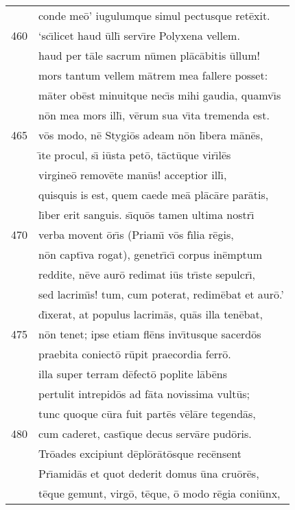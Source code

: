 \documentclass[paper=6in:9in,pagesize=pdftex,
               headinclude=on,footinclude=on,12pt]{scrbook}
\begin{document}
\begin{longtable}[p]{ r l }
 & conde me\=o' iugulumque simul pectusque ret\=exit.\\ 
460 & `sc\={\i}licet haud \=ull\={\i} serv\={\i}re Polyxena vellem.\\ 
 & haud per t\=ale sacrum n\=umen pl\=ac\=abitis \=ullum!\\ 
 & mors tantum vellem m\=atrem mea fallere posset:\\ 
 & m\=ater ob\=est minuitque nec\={\i}s mihi gaudia, quamv\={\i}s\\ 
 & n\=on mea mors ill\={\i}, v\=erum sua v\={\i}ta tremenda est.\\ 
465 & v\=os modo, n\=e Stygi\=os adeam n\=on l\={\i}bera m\=an\=es,\\ 
 & \={\i}te procul, s\={\i} i\=usta pet\=o, t\=act\=uque vir\={\i}l\=es\\ 
 & virgine\=o remov\=ete man\=us! acceptior ill\={\i},\\ 
 & quisquis is est, quem caede me\=a pl\=ac\=are par\=atis,\\ 
 & l\={\i}ber erit sanguis. s\={\i}qu\=os tamen ultima nostr\={\i}\\ 
470 & verba movent \=or\={\i}s (Priam\={\i} v\=os f\={\i}lia r\=egis,\\ 
 & n\=on capt\={\i}va rogat), genetr\={\i}c\={\i} corpus in\=emptum\\ 
 & reddite, n\=eve aur\=o redimat i\=us tr\={\i}ste sepulcr\={\i},\\ 
 & sed lacrim\={\i}s! tum, cum poterat, redim\=ebat et aur\=o.'\\ 
 & d\={\i}xerat, at populus lacrim\=as, qu\=as illa ten\=ebat,\\ 
475 & n\=on tenet; ipse etiam fl\=ens inv\={\i}tusque sacerd\=os\\ 
 & praebita coniect\=o r\=upit praecordia ferr\=o.\\ 
 & illa super terram d\=efect\=o poplite l\=ab\=ens\\ 
 & pertulit intrepid\=os ad f\=ata novissima vult\=us;\\ 
 & tunc quoque c\=ura fuit part\=es v\=el\=are tegend\=as,\\ 
480 & cum caderet, cast\={\i}que decus serv\=are pud\=oris.\\ 
 & \indent Tr\=oades excipiunt d\=epl\=or\=at\=osque rec\=ensent\\ 
 & Pr\={\i}amid\=as et quot dederit domus \=una cru\=or\=es,\\ 
 & t\=eque gemunt, virg\=o, t\=eque, \=o modo r\=egia coni\=unx,\\ 

\end{longtable}
\end{document}
